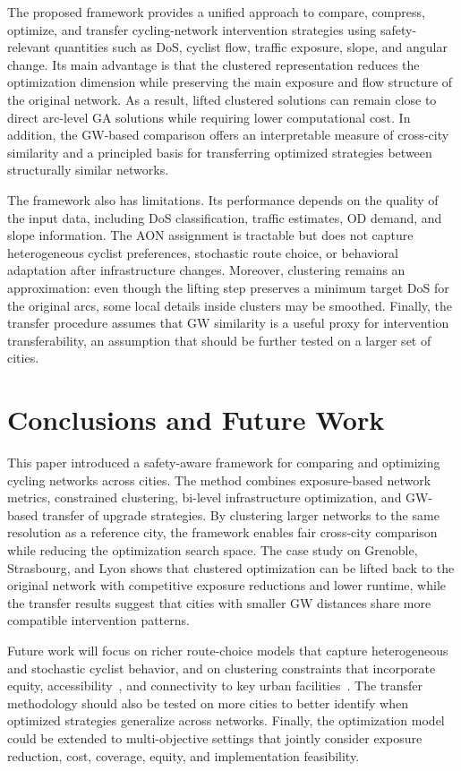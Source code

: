\documentclass[lettersize,journal]{IEEEtran}
\begin{document}
The proposed framework provides a unified approach to compare, compress,
optimize, and transfer cycling-network intervention strategies using
safety-relevant quantities such as DoS, cyclist flow, traffic exposure, slope,
and angular change. Its main advantage is that the clustered representation
reduces the optimization dimension while preserving the main exposure and flow
structure of the original network. As a result, lifted clustered solutions can
remain close to direct arc-level GA solutions while requiring lower
computational cost. In addition, the GW-based comparison offers an interpretable
measure of cross-city similarity and a principled basis for transferring
optimized strategies between structurally similar networks.

The framework also has limitations. Its performance depends on the quality of
the input data, including DoS classification, traffic estimates, OD demand, and
slope information. The AON assignment is tractable but does not capture
heterogeneous cyclist preferences, stochastic route choice, or behavioral
adaptation after infrastructure changes. Moreover, clustering remains an
approximation: even though the lifting step preserves a minimum target DoS for
the original arcs, some local details inside clusters may be smoothed. Finally,
the transfer procedure assumes that GW similarity is a useful proxy for
intervention transferability, an assumption that should be further tested on a
larger set of cities.

\section{Conclusions and Future Work}
\label{sec:conclusion}

This paper introduced a safety-aware framework for comparing and optimizing
cycling networks across cities. The method combines exposure-based network
metrics, constrained clustering, bi-level infrastructure optimization, and
GW-based transfer of upgrade strategies. By clustering larger networks to the
same resolution as a reference city, the framework enables fair cross-city
comparison while reducing the optimization search space. The case study on
Grenoble, Strasbourg, and Lyon shows that clustered optimization can be lifted
back to the original network with competitive exposure reductions and lower
runtime, while the transfer results suggest that cities with smaller GW
distances share more compatible intervention patterns.

Future work will focus on richer route-choice models that capture heterogeneous
and stochastic cyclist behavior, and on clustering constraints that incorporate
equity, accessibility~\cite{jurado2025transport}, and connectivity to key urban
facilities~\cite{jurado2025improving}. The transfer methodology should also be
tested on more cities to better identify when optimized strategies generalize
across networks. Finally, the optimization model could be extended to
multi-objective settings that jointly consider exposure reduction, cost,
coverage, equity, and implementation feasibility.
\end{document}
